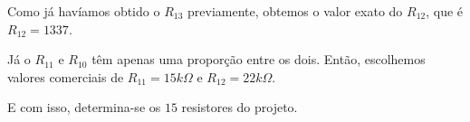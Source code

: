 Como já havíamos obtido o $R_{13}$ previamente, obtemos o valor exato do $R_{12}$, que é $R_{12} = 1337$.

Já o $R_{11}$ e $R_{10}$ têm apenas uma proporção entre os dois. Então, escolhemos valores comerciais de $R_{11} = 15k \Omega$ e $R_{12} = 22k \Omega$.

E com isso, determina-se os $15$ resistores do projeto.

